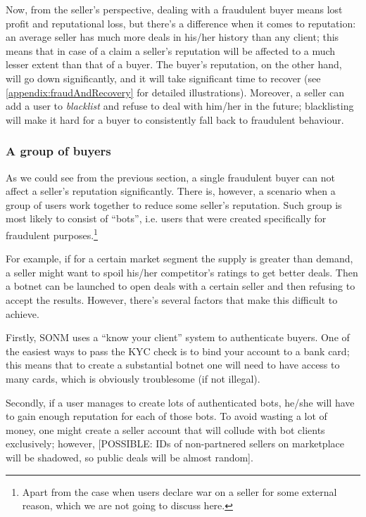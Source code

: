 \documentclass[11pt]{article}
\begin{document}
Now, from the seller's perspective, dealing with a fraudulent buyer means lost profit and reputational loss, but there's a difference when it comes to reputation: an average seller has much more deals in his/her history than any client; this means that in case of a claim a seller's reputation will be affected to a much lesser extent than that of a buyer. The buyer's reputation, on the other hand, will go down significantly, and it will take significant time to recover (see \ref{appendix:fraudAndRecovery} for detailed illustrations). Moreover, a seller can add a user to \textit{blacklist} and refuse to deal with him/her in the future; blacklisting will make it hard for a buyer to consistently fall back to fraudulent behaviour. 

\subsubsection{A group of buyers}

As we could see from the previous section, a single fraudulent buyer can not affect a seller's reputation significantly. There is, however, a scenario when a group of users work together to reduce some seller's reputation. Such group is most likely to consist of ``bots'', i.e. users that were created specifically for fraudulent purposes.\footnote{Apart from the case when users declare war on a seller for some external reason, which we are not going to discuss here.}

For example, if for a certain market segment the supply is greater than demand, a seller might want to spoil his/her competitor's ratings to get better deals. Then a botnet can be launched to open deals with a certain seller and then refusing to accept the results. However, there's several factors that make this difficult to achieve.

Firstly, SONM uses a ``know your client'' system to authenticate buyers. One of the easiest ways to pass the KYC check is to bind your account to a bank card; this means that to create a substantial botnet one will need to have access to many cards, which is obviously troublesome (if not illegal).

Secondly, if a user manages to create lots of authenticated bots, he/she will have to gain enough reputation for each of those bots. To avoid wasting a lot of money, one might create a seller account that will collude with bot clients exclusively; however, [POSSIBLE: IDs of non-partnered sellers on marketplace will be shadowed, so public deals will be almost random].
\end{document}

